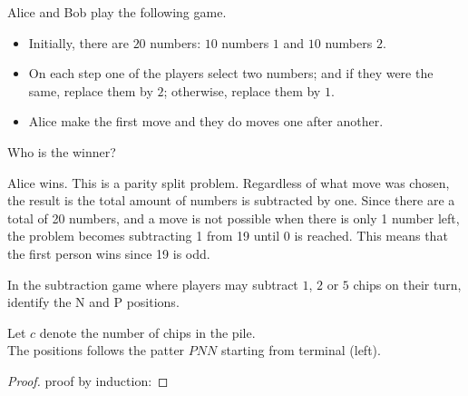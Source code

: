 \documentclass[addpoints,answers]{exam}
\begin{document}
    \pagestyle{headandfoot}
    \runningheadrule

    \firstpagefooter{}{}{}
    \runningfooter{}{}{}
    \begin{flushright}

        \vspace{0.2in}

    \end{flushright}

    \begin{questions}
        \question
            Alice and Bob play the following game.
            \begin{itemize}
                \item Initially, there are $20$ numbers: $10$ numbers $1$ and $10$ numbers
                    $2$.
                \item On each step one of the players select two numbers; and if they were
                    the same, replace them by $2$; otherwise, replace them by $1$.
                \item Alice make the first move and they do moves one after another.
            \end{itemize}
            Who is the winner?
            \begin{solutionorbox}[\stretch{1}]
							Alice wins. This is a parity split problem. Regardless of what move was
							chosen, the result is the total amount of numbers is subtracted by
							one. Since there are a total of 20 numbers, and a move is not
							possible when there is only 1 number left, the problem becomes
							subtracting 1 from 19 until 0 is reached. This means that the
							first person wins since 19 is odd.
            \end{solutionorbox}
            \newpage
 
        \question
            In the subtraction game where players may subtract $1$, $2$ or $5$ chips on
            their turn, identify the N and P positions.\\
            \begin{solutionorbox}[\stretch{1}]
							Let $c$ denote the number of chips in the pile.\\
							The positions follows the patter $PNN$ starting from terminal
							(left).
							\begin{proof} proof by induction:

\end{proof}
\end{solutionorbox}
\end{questions}
\end{document}
